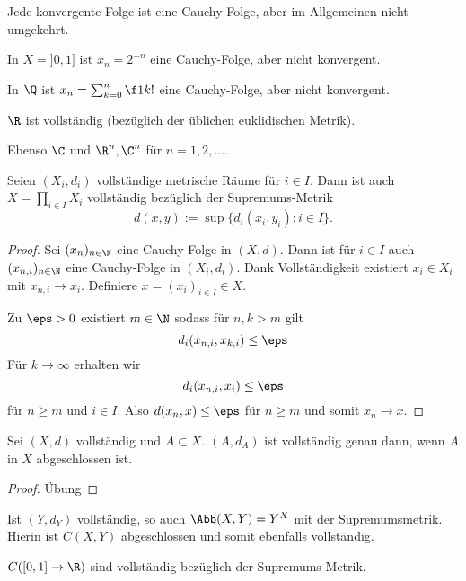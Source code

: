 \begin{nt}
	Jede konvergente Folge ist eine Cauchy-Folge, aber im Allgemeinen nicht umgekehrt.
\end{nt}

\begin{ex}
	In $X = ]0,1]$ ist $x_n = 2^{-n}$ eine Cauchy-Folge, aber nicht konvergent.

	In $\Q$ ist $x_n = \sum_{k=0}^n \f 1{k!}$ eine Cauchy-Folge, aber nicht konvergent.
\end{ex}

\begin{st}
	$\R$ ist vollständig (bezüglich der üblichen euklidischen Metrik).

	Ebenso $\C$ und $\R^n, \C^n$ für $n = 1, 2, \dotsc$.
\end{st}

\begin{st}
	Seien $(X_i,d_i)$ vollständige metrische Räume für $i \in I$.
	Dann ist auch $X = \prod_{i\in I} X_i$ vollständig bezüglich der Supremums-Metrik
	\[
		d(x,y) := \sup \{ d_i(x_i, y_i) : i \in I \}.
	\]
	\begin{proof}
		Sei $(x_n)_{n\in \N}$ eine Cauchy-Folge in $(X,d)$.
		Dann ist für $i \in I$ auch $(x_{n,i})_{n\in \N}$ eine Cauchy-Folge in $(X_i,d_i)$.
		Dank Vollständigkeit existiert $x_i \in X_i$ mit $x_{n,i} \to x_i$.
		Definiere $ x= (x_i)_{i\in I} \in X$.

		Zu  $\eps > 0$ existiert $m \in \N$ sodass für $n,k > m$ gilt
		\[
			d_i(x_{n,i}, x_{k,i}) \le \eps
		\]
		Für $k \to \infty$ erhalten wir
		\[
			d_i(x_{n,i},x_i) \le \eps
		\]
		für $n \ge m$ und $i \in I$.
		Also $d(x_n, x) \le \eps$ für $n \ge m$ und somit $x_n \to x$.
	\end{proof}
\end{st}

\begin{lem}
	Sei $(X,d)$ vollständig und $A \subset X$.
	$(A,d_A)$ ist vollständig genau dann, wenn $A$ in $X$ abgeschlossen ist.
	\begin{proof}
		Übung
	\end{proof}
\end{lem}

\begin{st}
	Ist $(Y,d_Y)$ vollständig, so auch $\Abb(X,Y) = Y^X$ mit der Supremumsmetrik.
	Hierin ist $C(X,Y)$ abgeschlossen und somit ebenfalls vollständig.
\end{st}

\begin{ex}
	$C([0,1] \to \R)$ sind vollständig bezüglich der Supremums-Metrik.
\end{ex}

